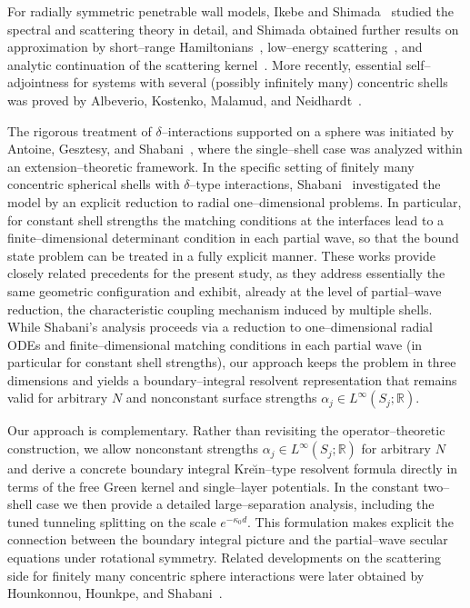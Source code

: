 \documentclass[a4paper,11pt]{article}
\numberwithin{equation}{section}
\theoremstyle{definition}
\theoremstyle{remark}
\begin{document}
For radially symmetric penetrable wall models, Ikebe and Shimada~\cite{IkebeShimada1991}
studied the spectral and scattering theory in detail, and Shimada obtained
further results on approximation by short--range Hamiltonians~\cite{Shimada1992},
low--energy scattering~\cite{Shimada1994LowE}, and analytic continuation of the
scattering kernel~\cite{Shimada1994AnalCont}.
More recently, essential self--adjointness for systems with several (possibly
infinitely many) concentric shells was proved by Albeverio, Kostenko, Malamud,
and Neidhardt~\cite{AlbeverioKostenkoMalamudNeidhardt}.

The rigorous treatment of $\delta$--interactions supported on a sphere
was initiated by Antoine, Gesztesy, and Shabani~\cite{AntoineGesztesyShabani1987},
where the single--shell case was analyzed within an extension--theoretic framework.
In the specific setting of finitely many concentric spherical shells with
$\delta$--type interactions, Shabani~\cite{Shabani1988JMP} investigated the model
by an explicit reduction to radial one--dimensional problems.
In particular, for constant shell strengths the matching conditions at the
interfaces lead to a finite--dimensional determinant condition in each partial wave,
so that the bound state problem can be treated in a fully explicit manner.
These works provide closely related precedents for the present study,
as they address essentially the same geometric configuration and exhibit,
already at the level of partial--wave reduction, the characteristic coupling
mechanism induced by multiple shells.
While Shabani's analysis proceeds via a reduction to one--dimensional radial ODEs and finite--dimensional matching conditions in each partial wave (in particular for constant shell strengths),
our approach keeps the problem in three dimensions and yields a boundary--integral resolvent representation that remains valid for arbitrary $N$ and nonconstant surface strengths $\alpha_j\in L^\infty(S_j;\mathbb R)$.

Our approach is complementary.
Rather than revisiting the operator--theoretic construction,
we allow nonconstant strengths $\alpha_j\in L^\infty(S_j;\mathbb R)$ for arbitrary $N$
and derive a concrete boundary integral Kre\u{\i}n--type resolvent formula
directly in terms of the free Green kernel and single--layer potentials.
In the constant two--shell case we then provide a detailed large--separation
analysis, including the tuned tunneling splitting on the scale
$e^{-\kappa_0 d}$.
This formulation makes explicit the connection between the boundary integral picture and the partial--wave secular equations under rotational symmetry.
Related developments on the scattering side for finitely many concentric sphere
interactions were later obtained by Hounkonnou, Hounkpe, and
Shabani~\cite{HounkonnouHounkpeShabani1997}.
\end{document}
